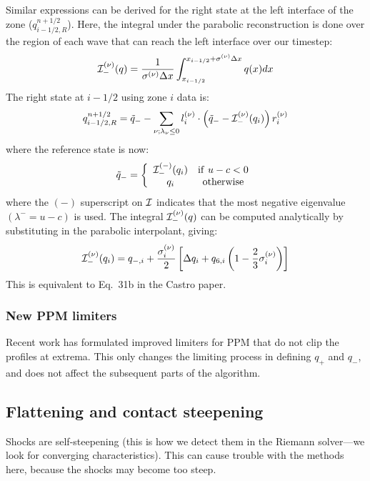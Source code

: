 Similar expressions can be derived for the right state at the left interface
of the zone ($q_{i-1/2,R}^{n+1/2}$).  Here, the integral under the parabolic
reconstruction is done over the region of each wave that can reach the left
interface over our timestep:
\begin{equation}
{\mathcal{I}}_-^{(\nu)}(q) = \frac{1}{\sigma^{(\nu)} \Delta x}
  \int_{x_{i-1/2}}^{x_{i-1/2} + \sigma^{(\nu)} \Delta x} q(x) dx
\end{equation}
The right state at $i-1/2$ using zone $i$ data is:
\begin{equation}
q_{i-1/2,R}^{n+1/2} = \tilde{q}_- - \sum_{\nu; \lambda_\nu \le 0}
   l_i^{(\nu)} \cdot \left ( \tilde{q}_- - {\mathcal{I}}_-^{(\nu)}(q_i) \right ) r_i^{(\nu)}
\end{equation}
where the reference state is now:
\begin{equation}
\tilde{q}_- = \left \{ \begin{array}{cc}
   {\mathcal{I}}_-^{(-)}(q_i) & \mathrm{if~} u - c < 0 \\
    q_i                   & \mathrm{otherwise}
\end{array} \right .
\end{equation}
where the $(-)$ superscript on ${\mathcal{I}}$ indicates that the most
negative eigenvalue $(\lambda^- = u - c)$ is used.  The integral
${\mathcal{I}}_-^{(\nu)}(q)$ can be computed analytically by
substituting in the parabolic interpolant, giving:
\begin{equation}
{\mathcal{I}}_-^{(\nu)}(q_i) = q_{-,i} + \frac{\sigma_i^{(\nu)}}{2}
   \left [ \Delta q_i + q_{6,i} \left ( 1 - \frac{2}{3} \sigma_i^{(\nu)} \right ) \right ]
\end{equation}
This is equivalent to Eq.~31b in the Castro paper.

\subsubsection{New PPM limiters}

Recent work \cite{colellasekora} has formulated improved limiters for
PPM that do not clip the profiles at extrema.  This only changes the
limiting process in defining $q_+$ and $q_-$, and does not affect the
subsequent parts of the algorithm.


\subsection{Flattening and contact steepening}

  Shocks are self-steepening (this is how we
  detect them in the Riemann solver---we look for converging characteristics).
  This can cause trouble with the methods here, because the shocks may become
  too steep.

